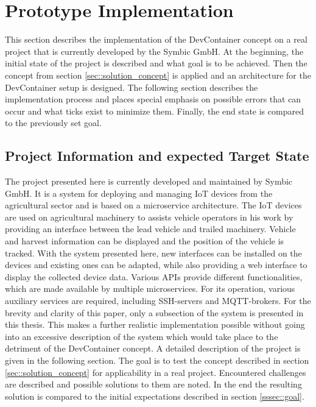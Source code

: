 
\section{Prototype Implementation}\label{sec::solution_code}
This section describes the implementation of the DevContainer concept on a real project that is currently developed by the Symbic GmbH. At the beginning, the initial state of the project is described and what goal is to be achieved. Then the concept from section \ref{sec::solution_concept} is applied and an architecture for the DevContainer setup is designed. The following section describes the implementation process and places special emphasis on possible errors that can occur and what ticks exist to minimize them. Finally, the end state is compared to the previously set goal.

    \subsection{Project Information and expected Target State}
    The project presented here is currently developed and maintained by Symbic GmbH. It is a system for deploying and managing \ac{IoT} devices from the agricultural sector and is based on a microservice architecture. The \ac{IoT} devices are used on agricultural machinery to assists vehicle operators in his work by providing an interface between the lead vehicle and trailed machinery. Vehicle and harvest information can be displayed and the position of the vehicle is tracked. With the system presented here, new interfaces can be installed on the devices and existing ones can be adapted, while also providing a web interface to display the collected device data. Various \ac{API}s provide different functionalities, which are made available by multiple microservices. For its operation, various auxiliary services are required, including \ac{SSH}-servers and MQTT-brokers. For the brevity and clarity of this paper, only a subsection of the system is presented in this thesis. This makes a further realistic implementation possible without going into an excessive description of the system which would take place to the detriment of the DevContainer concept. A detailed description of the project is given in the following section. \newline
    The goal is to test the concept described in section \ref{sec::solution_concept} for applicability in a real project. Encountered challenges are described and possible solutions to them are noted. In the end the resulting solution is compared to the initial expectations described in section \ref{sssec::goal}.

